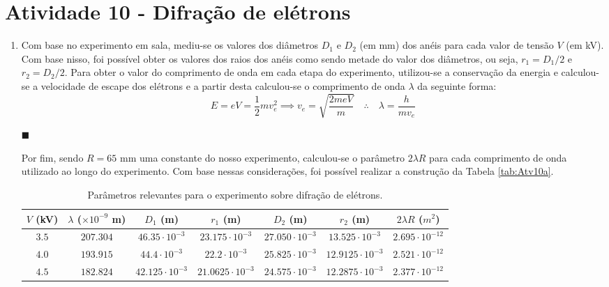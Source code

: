 \documentclass[12pt,a4paper]{article}
\begin{document}
\section*{Atividade 10 - Difração de elétrons}
\begin{enumerate}
    \item Com base no experimento em sala, mediu-se os valores dos diâmetros $D_1$ e $D_2$ (em mm) dos anéis para cada valor de tensão $V$ (em kV). Com base nisso, foi possível obter os valores dos raios dos anéis como sendo metade do valor dos diâmetros, ou seja, $r_1=D_1/2$ e $r_2=D_2/2$. Para obter o valor do comprimento de onda em cada etapa do experimento, utilizou-se a conservação da energia e calculou-se a velocidade de escape dos elétrons e a partir desta calculou-se o comprimento de onda $\lambda$ da seguinte forma:
    \begin{equation} \label{eq:10a}
        E=eV=\frac{1}{2}mv^2_e\implies v_e=\sqrt{\frac{2meV}{m}}\quad\therefore\quad\boxed{\lambda=\frac{h}{mv_e}}
    \end{equation}
    \begin{flushright}
        $\blacksquare$
    \end{flushright}

    Por fim, sendo $R=65\text{ mm}$ uma constante do nosso experimento, calculou-se o parâmetro $2\lambda R$ para cada comprimento de onda utilizado ao longo do experimento. Com base nessas considerações, foi possível realizar a construção da Tabela \ref{tab:Atv10a}.
    
    \begin{table}[htp!]
            \centering
            \caption{Parâmetros relevantes para o experimento sobre difração de elétrons.}
            \begin{tabular}{|c|c|c|c|c|c|c|}
            \hline
            $V$ (kV) & $\lambda$ ($\times10^{-9}$ m) & $D_1$ (m) & $r_1$ (m) & $D_2$ (m) & $r_2$ (m) & $2\lambda R$ ($m^2$) \\
            \hline
                $3.5$ & $207.304$ & $46.35\cdot10^{-3}$ & $23.175\cdot10^{-3}$ & $27.050\cdot10^{-3}$ & $13.525\cdot10^{-3}$ & $2.695\cdot10^{-12}$ \\
                
                $4.0$ & $193.915$ & $44.4\cdot10^{-3}$ & $22.2\cdot10^{-3}$ & $25.825\cdot10^{-3}$ & $12.9125\cdot10^{-3}$ & $2.521\cdot10^{-12}$ \\

                $4.5$ & $182.824$ & $42.125\cdot10^{-3}$ & $21.0625\cdot10^{-3}$ & $24.575\cdot10^{-3}$ & $12.2875\cdot10^{-3}$ & $2.377\cdot10^{-12}$ \\


\end{tabular}
\end{table}
\end{enumerate}
\end{document}
